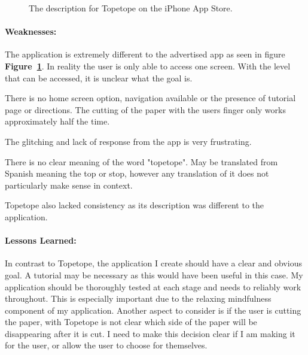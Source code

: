 \documentclass[11pt]{article}
\begin{document}
\begin{figure}[!ht]
\begin{minipage}{0.48\textwidth}
                            \captionsetup{margin = 0.5cm}
                            \caption{The description for Topetope on the iPhone App Store.}
                            \label{fig:topeAdvertising}
                        \end{minipage}
                    \end{figure}
                    

                \paragraph{Weaknesses:}
                The application is extremely different to the advertised app as seen in figure \textbf{Figure~\ref{fig:topeAdvertising}}. In reality the user is only able to access one screen. With the level that can be accessed, it is unclear what the goal is.
                
                There is no home screen option, navigation available or the presence of tutorial page or directions. The cutting of the paper with the users finger only works approximately half the time.
                
                The glitching and lack of response from the app is very frustrating.
                
                
                There is no clear meaning of the word "topetope". May be translated from Spanish meaning the top or stop, however any translation of it does not particularly make sense in context. 
                
                 Topetope also lacked consistency as its description was different to the application.

                \paragraph{Lessons Learned:}
                In contrast to Topetope, the application I create should have a clear and obvious goal. A tutorial may be necessary as this would have been useful in this case. My application should be thoroughly tested at each stage and needs to reliably work throughout. This is especially important due to the relaxing mindfulness component of my application. Another aspect to consider is if the user is cutting the paper, with Topetope is not clear which side of the paper will be disappearing after it is cut. I need to make this decision clear if I am making it for the user, or allow the user to choose for themselves. 
\end{document}
